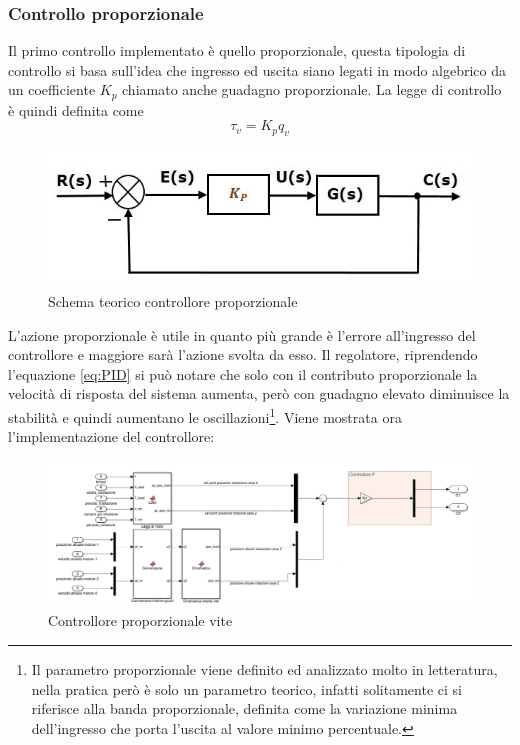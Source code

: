 \subsubsection{Controllo proporzionale}
Il primo controllo implementato è quello proporzionale, questa tipologia di controllo si basa sull'idea che ingresso ed uscita siano legati in modo algebrico da un coefficiente $K_p$ chiamato anche guadagno proporzionale. La legge di controllo è quindi definita come
\begin{equation}
\tau_v = K_p q_v
\end{equation}
\begin{figure}[ht]
	\begin{center}
		\includegraphics[scale=0.6]{Immagini/Controllori/Pschema}
		\caption{Schema teorico controllore proporzionale}
		\label{fig:Pschema}
	\end{center}
\end{figure}
L'azione proporzionale è utile in quanto più grande è l'errore all'ingresso del controllore e maggiore sarà l'azione svolta da esso. Il regolatore, riprendendo l'equazione \ref{eq:PID} si può notare che solo con il contributo proporzionale la velocità di risposta del sistema aumenta, però con guadagno elevato diminuisce la stabilità e quindi aumentano le oscillazioni\footnote{Il parametro proporzionale viene definito ed analizzato molto in letteratura, nella pratica però è solo un parametro teorico, infatti solitamente ci si riferisce alla banda proporzionale, definita come la variazione minima dell'ingresso che porta l'uscita al valore minimo percentuale.}.
Viene mostrata ora l'implementazione del controllore:
\begin{figure}[ht]
	\begin{center}
		\includegraphics[scale=0.37]{Immagini/Controllori/ViteP}
		\caption{Controllore proporzionale vite}
		\label{fig:PVite}
	\end{center}
\end{figure}
